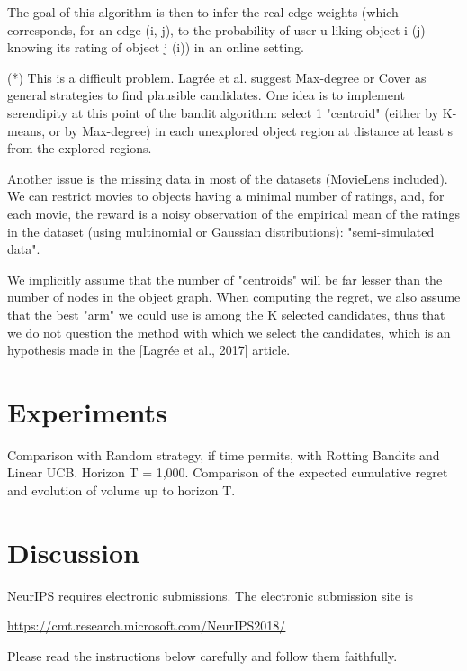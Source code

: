 \documentclass{article}
\begin{document}
The goal of this algorithm is then to infer the real edge weights (which corresponds, for an edge (i, j), to the probability of user u liking object i (j) knowing its rating of object j (i)) in an online setting.

(*) This is a difficult problem. Lagrée et al. suggest Max-degree or Cover as general strategies to find plausible candidates. One idea is to implement serendipity at this point of the bandit algorithm: select 1 "centroid" (either by K-means, or by Max-degree) in each unexplored object region at distance at least s from the explored regions.

Another issue is the missing data in most of the datasets (MovieLens included). We can restrict movies to objects having a minimal number of ratings, and, for each movie, the reward is a noisy observation of the empirical mean of the ratings in the dataset (using multinomial or Gaussian distributions): "semi-simulated data".

We implicitly assume that the number of "centroids" will be far lesser than the number of nodes in the object graph. When computing the regret, we also assume that the best "arm" we could use is among the K selected candidates, thus that we do not question the method with which we select the candidates, which is an hypothesis made in the [Lagrée et al., 2017] article.

\section{Experiments}

Comparison with Random strategy, if time permits, with Rotting Bandits and Linear UCB. Horizon T = 1,000. Comparison of the expected cumulative regret and evolution of volume up to horizon T.


\section{Discussion}


NeurIPS requires electronic submissions.  The electronic submission site is
\begin{center}
  \url{https://cmt.research.microsoft.com/NeurIPS2018/}
\end{center}

Please read the instructions below carefully and follow them faithfully.
\end{document}
